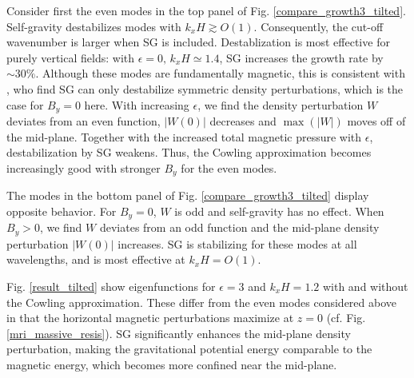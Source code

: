 Consider first the even modes in the top panel of 
Fig. \ref{compare_growth3_tilted}. %
Self-gravity destabilizes modes with  $k_xH\gtrsim O(1)$. Consequently, the
cut-off wavenumber is larger when SG is included. %
Destablization is most effective for purely vertical fields: with
$\epsilon=0,\, 
k_xH\simeq 1.4$, SG increases the growth rate by $\sim 30\%$. Although
these modes are fundamentally magnetic, this is consistent with
\cite{goldreich65a}, who find SG can only destabilize 
symmetric density perturbations, which is the case for $B_y=0$ here.  
With increasing $\epsilon$, we find the density perturbation $W$ deviates from an even 
function, $|W(0)|$ decreases and $\max{(|W|)}$ moves off of the mid-plane.  
Together with the increased total magnetic pressure with 
$\epsilon$, destabilization by SG weakens. 
Thus, the Cowling approximation becomes increasingly good with stronger
$B_y$ for the even modes. 


The modes in the bottom panel of Fig. \ref{compare_growth3_tilted} 
display opposite behavior. For $B_y=0$, $W$ is odd and 
self-gravity has no effect. When $B_y>0$, we find $W$ deviates from an odd
function and the mid-plane density perturbation $|W(0)|$ increases. 
SG is stabilizing for these modes at all wavelengths, and is most
effective at $k_xH =  O(1)$.  

Fig. \ref{result_tilted} show eigenfunctions for $\epsilon=3$ and
$k_xH=1.2$ with and without the Cowling approximation. These differ
from the even modes considered above in that the horizontal magnetic
perturbations maximize at $z=0$ (cf. Fig. \ref{mri_massive_resis}).  
SG significantly enhances the mid-plane density perturbation, making the
gravitational potential energy comparable to the magnetic energy, 
which becomes more confined near the mid-plane. 

